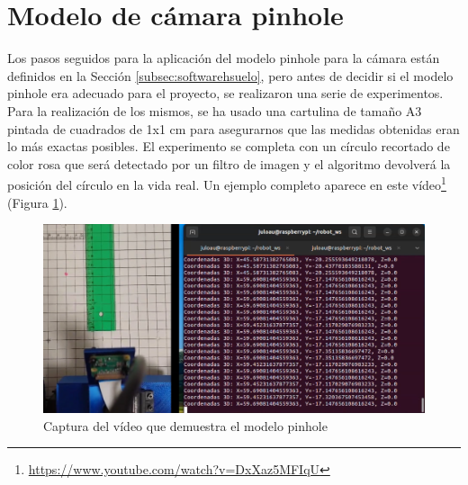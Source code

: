 \section{Modelo de cámara pinhole}
\label{sec:expmodelopinhole}

Los pasos seguidos para la aplicación del modelo pinhole para la cámara están definidos en la Sección \ref{subsec:softwarehsuelo}, pero antes de decidir si el modelo pinhole era adecuado para el proyecto, se realizaron una serie de experimentos. Para la realización de los mismos, se ha usado una cartulina de tamaño A3 pintada de cuadrados de 1x1 cm para asegurarnos que las medidas obtenidas eran lo más exactas posibles. El experimento se completa con un círculo recortado de color rosa que será detectado por un filtro de imagen y el algoritmo devolverá la posición del círculo en la vida real. Un ejemplo completo aparece en este vídeo\footnote{\url{https://www.youtube.com/watch?v=DxXaz5MFIqU}} (Figura \ref{fig:exppinhole}).



\begin{figure} [h!]
	\begin{center}
			\includegraphics[width=15cm]{figs/cap7/exppinhole.png}
		\end{center}
	\caption{Captura del vídeo que demuestra el modelo pinhole}
	\label{fig:exppinhole}
\end{figure}


